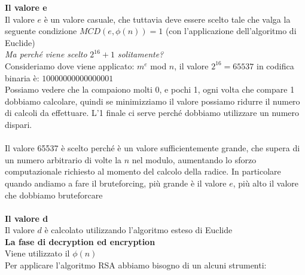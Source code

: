 \documentclass[11pt, oneside]{article}   	%
\begin{document}
\textbf{Il valore e}\\
Il valore $e$ è un valore casuale, che tuttavia deve essere scelto tale che valga la seguente condizione $MCD(e, \phi(n))=1$ (con l'applicazione dell'algoritmo di Euclide)\\ \emph{Ma perché viene scelto} $2^{16}+1$ \emph{solitamente?}\\
Consideriamo dove viene applicato: $m^e$ mod $n$, il valore $2^{16} = 65537$ in codifica binaria è: $10000000000000001$\\
Possiamo vedere che la compaiono molti 0, e pochi 1, ogni volta che compare 1 dobbiamo calcolare, quindi se minimizziamo il valore possiamo ridurre il numero di calcoli da effettuare. L'1 finale ci serve perché dobbiamo utilizzare un numero dispari. \\\\Il valore 65537 è scelto perché è un valore sufficientemente grande, che supera di un numero arbitrario di volte la $n$ nel modulo, aumentando lo sforzo computazionale richiesto al momento del calcolo della radice. In particolare quando andiamo a fare il bruteforcing, più grande è il valore $e$, più alto il valore che dobbiamo bruteforcare\\\\
\textbf{Il valore d}\\
Il valore $d$ è calcolato utilizzando l'algoritmo esteso di Euclide\\
\textbf{La fase di decryption ed encryption}\\
Viene utilizzato il $\phi(n)$\\

Per applicare l'algoritmo RSA abbiamo bisogno di un alcuni strumenti:
\end{document}
